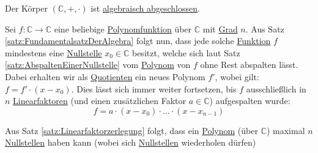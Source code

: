 \documentclass[../../main.tex]{subfiles}
\begin{document}
		\begin{theorem}
			\label{satz:FundamentalsatzDerAlgebra}
			Der Körper $(\mathbb{C},+,\cdot)$ ist \hyperref[def:algebraischAbgeschlossen]{algebraisch abgeschlossen}. 
		\end{theorem}
	
		\begin{theorem}
			\label{satz:Linearfaktorzerlegung}
			Sei $f: \mathbb{C} \rightarrow \mathbb{C}$ eine beliebige \hyperref[def:Polynomfunktion]{Polynomfunktion} über $\mathbb{C}$ mit \hyperref[def:GradEinesPolynoms]{Grad} $n$. Aus Satz \ref{satz:FundamentalsatzDerAlgebra} folgt nun, dass jede solche \hyperref[def:Funktion]{Funktion} $f$ mindestens eine \hyperref[def:Nullstelle]{Nullstelle} $x_0 \in \mathbb{C}$ besitzt, welche sich laut Satz \ref{satz:AbspaltenEinerNullstelle} vom \hyperref[def:Polynom]{Polynom} von $f$ ohne Rest abspalten lässt. Dabei erhalten wir als \hyperref[def:Quotient]{Quotienten} ein neues Polynom $f'$, wobei gilt: $f=f'\cdot(x-x_0)$. Dies lässt sich immer weiter fortsetzen, bis $f$ ausschließlich in $n$ \hyperref[def:Linearfaktor]{Linearfaktoren} (und einen zusätzlichen Faktor $a \in \mathbb{C}$) aufgespalten wurde: $$f = a \cdot (x-x_0) \cdot ... \cdot (x-x_{n-1})$$
		\end{theorem}
	
		\begin{theorem}
			Aus Satz \ref{satz:Linearfaktorzerlegung} folgt, dass ein \hyperref[def:Polynom]{Polynom} (über $\mathbb{C}$) maximal $n$ \hyperref[def:Nullstelle]{Nullstellen} haben kann (wobei sich \hyperref[def:Nullstelle]{Nullstellen} wiederholen dürfen)
		\end{theorem}
	
\end{document}
